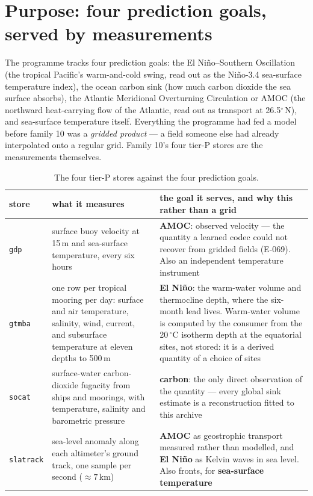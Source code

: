 \documentclass[10pt]{article}
\newcommand{\code}[1]{\texttt{#1}}
\begin{document}
\section{Purpose: four prediction goals, served by measurements}

The programme tracks four prediction goals: the El Ni\~no--Southern Oscillation
(the tropical Pacific's warm-and-cold swing, read out as the Ni\~no-3.4
sea-surface temperature index), the ocean carbon sink (how much carbon dioxide
the sea surface absorbs), the Atlantic Meridional Overturning Circulation or
AMOC (the northward heat-carrying flow of the Atlantic, read out as transport at
26.5$^\circ$\,N), and sea-surface temperature itself. Everything the programme
had fed a model before family 10 was a \emph{gridded product} --- a field
someone else had already interpolated onto a regular grid. Family 10's four
tier-P stores are the measurements themselves.

\begin{table}[h]
\centering\setlength{\tabcolsep}{4pt}\footnotesize
\begin{tabular}{@{}>{\raggedright\arraybackslash}p{1.7cm}>{\raggedright\arraybackslash}p{5.2cm}>{\raggedright\arraybackslash}p{8.0cm}@{}}
\toprule
store & what it measures & the goal it serves, and why this rather than a grid \\
\midrule
\code{gdp} & surface buoy velocity at 15\,m and sea-surface temperature, every six hours & \textbf{AMOC}: observed velocity --- the quantity a learned codec could not recover from gridded fields (E-069). Also an independent temperature instrument \\
\addlinespace
\code{gtmba} & one row per tropical mooring per day: surface and air temperature, salinity, wind, current, and subsurface temperature at eleven depths to 500\,m & \textbf{El Ni\~no}: the warm-water volume and thermocline depth, where the six-month lead lives. Warm-water volume is computed by the consumer from the 20\,$^\circ$C isotherm depth at the equatorial sites, not stored: it is a derived quantity of a choice of sites \\
\addlinespace
\code{socat} & surface-water carbon-dioxide fugacity from ships and moorings, with temperature, salinity and barometric pressure & \textbf{carbon}: the only direct observation of the quantity --- every global sink estimate is a reconstruction fitted to this archive \\
\addlinespace
\code{slatrack} & sea-level anomaly along each altimeter's ground track, one sample per second ($\approx 7$\,km) & \textbf{AMOC} as geostrophic transport measured rather than modelled, and \textbf{El Ni\~no} as Kelvin waves in sea level. Also fronts, for \textbf{sea-surface temperature} \\
\bottomrule
\end{tabular}
\caption{The four tier-P stores against the four prediction goals.}
\label{tab:goals}
\end{table}
\end{document}
